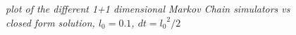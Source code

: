 \documentclass[english,a4paper,12pt]{article}
\begin{document}
\subsection*{}
\begin{figure}[H]
 \begin{center}
 \end{center}
 \caption{\textit{plot of the different 1+1 dimensional Markov Chain simulators vs closed form solution, $l_0 = 0.1$, $dt = {l_0}^2 /2$}}
 \label{fig:edge}
\end{figure}
\end{document}
